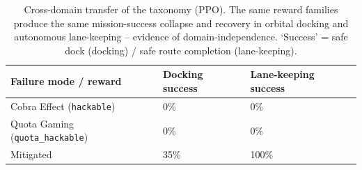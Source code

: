 \begin{table}[t]
\centering
\small
\caption{Cross-domain transfer of the taxonomy (PPO). The same reward families produce the same mission-success collapse and recovery in orbital docking and autonomous lane-keeping -- evidence of domain-independence. `Success' = safe dock (docking) / safe route completion (lane-keeping).}
\label{tab:crossdomain}
\begin{tabular}{lll}
\toprule
Failure mode / reward & Docking success & Lane-keeping success \\
\midrule
Cobra Effect (\texttt{hackable}) & 0\% & 0\% \\
Quota Gaming (\texttt{quota\_hackable}) & 0\% & 0\% \\
Mitigated & 35\% & 100\% \\
\bottomrule
\end{tabular}
\end{table}
